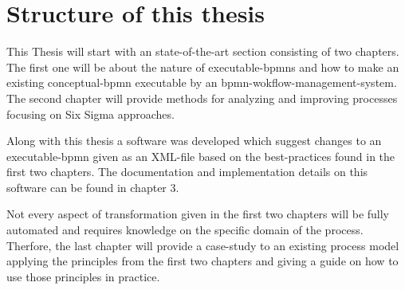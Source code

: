 \section{Structure of this thesis}
This Thesis will start with an state-of-the-art section consisting of two chapters. The first one will be about the nature of \gls{executable-bpmn}s and how to make an existing \gls{conceptual-bpmn} executable by an \gls{bpmn-wokflow-management-system}. The second chapter will provide methods for analyzing and improving processes focusing on Six Sigma approaches.

Along with this thesis a software was developed which suggest changes to an \gls{executable-bpmn} given as an \gls{XML}-file based on the best-practices found in the first two chapters. The documentation and implementation details on this software can be found in chapter 3. 

Not every aspect of transformation given in the first two chapters will be fully automated and requires knowledge on the specific domain of the process. Therfore, the last chapter will provide a case-study to an existing process model applying the principles from the first two chapters and giving a guide on how to use those principles in practice.

